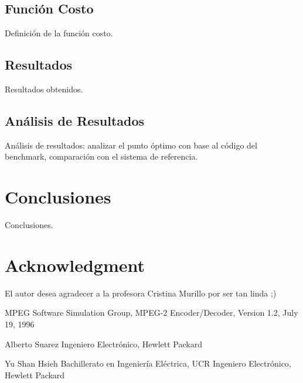 \documentclass[journal]{IEEEtran}
\begin{document}
\subsection{Funci\'{o}n Costo}
Definici\'{o}n de la funci\'{o}n costo.

\subsection{Resultados}
Resultados obtenidos.

\subsection{An\'{a}lisis de Resultados}
An\'{a}lisis de resultados: analizar el punto \'{o}ptimo con base al c\'{o}digo del benchmark, comparaci\'{o}n con el sistema de referencia.

\section{Conclusiones}
Conclusiones.

\section*{Acknowledgment}


El autor desea agradecer a la profesora Cristina Murillo por ser tan linda ;)

\begin{thebibliography}{1}

MPEG Software Simulation Group, MPEG-2 Encoder/Decoder, Version 1.2, July 19, 1996
\end{thebibliography}

\begin{IEEEbiographynophoto}{Alberto Suarez}
Ingeniero Electr\'{o}nico, Hewlett Packard
\end{IEEEbiographynophoto}

\begin{IEEEbiographynophoto}{Yu Shan Hsieh}
Bachillerato en Ingenier\'{i}a El\'{e}ctrica, UCR
Ingeniero Electr\'{o}nico, Hewlett Packard
\end{IEEEbiographynophoto}
\end{document}
